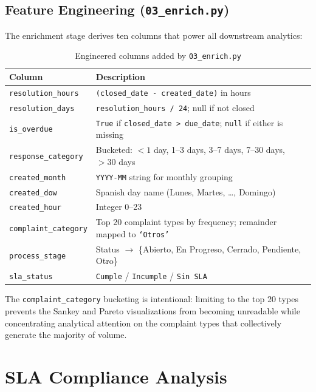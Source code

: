 \subsection{Feature Engineering (\texttt{03\_enrich.py})}

The enrichment stage derives ten columns that power all downstream analytics:

\begin{table}[h]
\centering
\caption{Engineered columns added by \texttt{03\_enrich.py}}
\label{tab:ops-enriched-cols}
\begin{tabularx}{\textwidth}{lX}
\toprule
\textbf{Column} & \textbf{Description} \\
\midrule
\texttt{resolution\_hours} & \texttt{(closed\_date - created\_date)} in hours \\
\texttt{resolution\_days} & \texttt{resolution\_hours / 24}; null if not closed \\
\texttt{is\_overdue} & \texttt{True} if \texttt{closed\_date > due\_date}; \texttt{null} if either is missing \\
\texttt{response\_category} & Bucketed: $<1$ day, 1--3 days, 3--7 days, 7--30 days, $>30$ days \\
\texttt{created\_month} & \texttt{YYYY-MM} string for monthly grouping \\
\texttt{created\_dow} & Spanish day name (Lunes, Martes, \ldots, Domingo) \\
\texttt{created\_hour} & Integer 0--23 \\
\texttt{complaint\_category} & Top 20 complaint types by frequency; remainder mapped to \texttt{`Otros'} \\
\texttt{process\_stage} & Status $\to$ \{Abierto, En Progreso, Cerrado, Pendiente, Otro\} \\
\texttt{sla\_status} & \texttt{Cumple} / \texttt{Incumple} / \texttt{Sin SLA} \\
\bottomrule
\end{tabularx}
\end{table}

The \texttt{complaint\_category} bucketing is intentional: limiting to the top 20 types prevents the Sankey and Pareto visualizations from becoming unreadable while concentrating analytical attention on the complaint types that collectively generate the majority of volume.

\section{SLA Compliance Analysis}
\label{sec:ops-sla}


